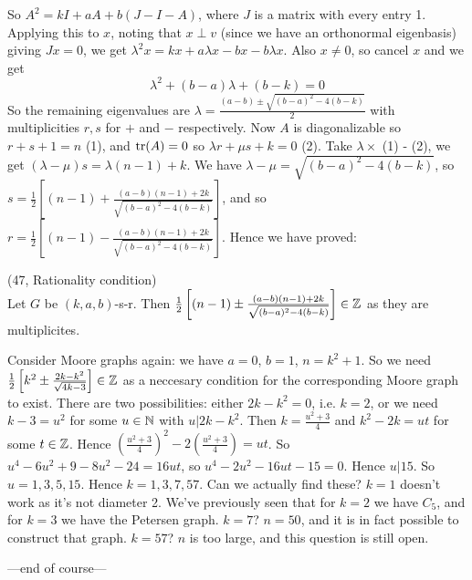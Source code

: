 \documentclass[a4paper]{article}
\begin{document}
So $A^2 =kI+aA+b(J-I-A)$, where $J$ is a matrix with every entry 1. Applying this to $x$, noting that $x \perp v$ (since we have an orthonormal eigenbasis) giving $Jx=0$, we get $\lambda^2 x = kx + a\lambda x - bx - b\lambda x$. Also $x \neq 0$, so cancel $x$ and we get $$\lambda^2+(b-a)\lambda +(b-k) = 0$$ So the remaining eigenvalues are $\lambda = \frac{(a-b) \pm \sqrt{(b-a)^2-4(b-k)}}{2}$ with multiplicities $r,s$ for $+$ and $-$ respectively. Now $A$ is diagonalizable so $r+s+1=n$ (1), and $\operatorname{tr}(A) = 0$ so $\lambda r + \mu s + k = 0$ (2). Take $\lambda \times$ (1) - (2), we get $(\lambda - \mu) s = \lambda(n-1)+k$. We have $\lambda - \mu = \sqrt{(b-a)^2-4(b-k)}$, so $s = \frac{1}{2} \left[(n-1)+\frac{(a-b)(n-1)+2k}{\sqrt{(b-a)^2 - 4(b-k)}}\right]$, and so $r = \frac{1}{2} \left[(n-1)-\frac{(a-b)(n-1)+2k}{\sqrt{(b-a)^2 - 4(b-k)}}\right]$. Hence we have proved:

\begin{thm} (47, Rationality condition)\\
Let $G$ be $(k,a,b)$-s-r. Then $\frac{1}{2} \left[(n-1) \pm \frac{(a-b)(n-1)+2k}{\sqrt{(b-a)^2 - 4(b-k)}}\right] \in \mathbb{Z}$ as they are multiplicites.
\end{thm}

\begin{eg}
Consider Moore graphs again: we have $a=0$, $b=1$, $n=k^2+1$. So we need $\frac{1}{2}\left[k^2 \pm \frac{2k-k^2}{\sqrt{4k-3}} \right] \in \mathbb{Z}$ as a neccesary condition for the corresponding Moore graph to exist. There are two possibilities: either $2k-k^2=0$, i.e. $k=2$, or we need $k-3 = u^2$ for some $u \in \mathbb{N}$ with $u|2k-k^2$. Then $k=\frac{u^2+3}{4}$ and $k^2-2k = ut$ for some $t \in \mathbb{Z}$. Hence $(\frac{u^2+3}{4})^2 - 2(\frac{u^2+3}{4}) = ut$. So $u^4 - 6u^2+9-8u^2-24 = 16ut$, so $u^4-2u^2-16ut-15=0$. Hence $u | 15$. So $u=1,3,5,15$. Hence $k=1,3,7,57$. Can we actually find these? $k=1$ doesn't work as it's not diameter 2. We've previously seen that for $k=2$ we have $C_5$, and for $k=3$ we have the Petersen graph. $k=7$? $n=50$, and it is in fact possible to construct that graph. $k=57$? $n$ is too large, and this question is still open.
\end{eg}

---end of course---
\end{document}
